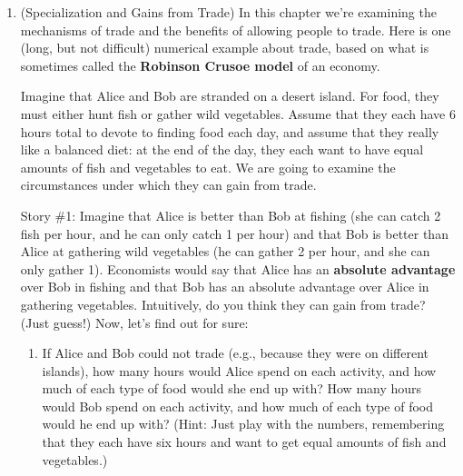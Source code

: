 \begin{enumerate}
\begin{comment}
\item \emph{Challenge.} Show that an envy-free division is also proportional.\endnote{To show that envy-free implies proportional, we will show that not proportional implies not envy-free. If a cake division is not proportional, one child gets less than $\frac{1}{n}$th of the cake (in her estimation). This means that (according to her estimation) the other $(n-1)$ children get more than $\frac{n-1}{n}$th of the cake. Therefore at least one of the other children must have a piece bigger than $\frac{1}{n}$th, meaning that the cake division is not envy-free.}
\end{comment}





\item \label{comparativeadvantage} (Specialization and Gains from Trade) In this chapter we're examining the mechanisms of trade and the benefits of allowing people to trade. Here is one (long, but not difficult) numerical example about trade, based on what is sometimes called the \textbf{Robinson Crusoe model} of an economy.

Imagine that Alice and Bob are stranded on a desert island. For food, they must either hunt fish or gather wild vegetables. Assume that they each have 6 hours total to devote to finding food each day, and assume that they really like a balanced diet: at the end of the day, they each want to have equal amounts of fish and vegetables to eat. We are going to examine the circumstances under which they can gain from trade.

Story \#1: Imagine that Alice is better than Bob at fishing (she can catch 2 fish per hour, and he can only catch 1 per hour) and that Bob is better than Alice at gathering wild vegetables (he can gather 2 per hour, and she can only gather 1). Economists would say that Alice has an \textbf{absolute advantage} over Bob in fishing and that Bob has an absolute advantage over Alice in gathering vegetables. Intuitively, do you think they can gain from trade?  %
(Just guess!) Now, let's find out for sure:

    \begin{enumerate}

    \item \label{absolute} If Alice and Bob could not trade (e.g., because they were on different islands), how many hours would Alice spend on each activity, and how much of each type of food would she end up with? How many hours would Bob spend on each activity, and how much of each type of food would he end up with? (Hint: Just play with the numbers, remembering that they each have six hours and want to get equal amounts of fish and vegetables.)



\end{enumerate}
\end{enumerate}
